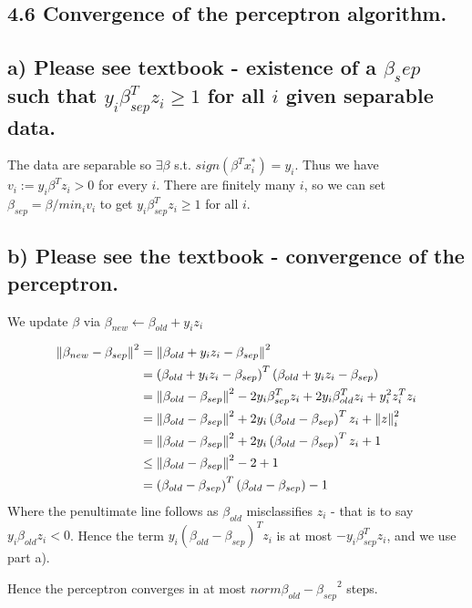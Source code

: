 \subsection*{ 4.6 Convergence of the perceptron algorithm.}
\subsection*{a) Please see textbook - existence of a $\beta_sep$ such that $y_i \beta_{sep}^T z_i \geq 1$ for all $i$ given separable data.}

The data are separable so $\exists \beta$ s.t. $ sign(\beta^T x_i^*) = y_i$.
Thus we have $v_i := y_i \beta^T z_i > 0$ for every $i$.
There are finitely many $i$, so we can set $\beta_{sep} = \beta / min_i v_i$ to get $y_i \beta_{sep}^T z_i \geq 1$ for all $i$.

\subsection*{b) Please see the textbook - convergence of the perceptron.}

We update $\beta$ via $\beta_{new} \leftarrow \beta_{old} + y_i z_i$

\begin{align*}
    \left\lVert\beta_{new} - \beta_{sep}\right\rVert^2 &= \left\lVert\beta_{old} + y_i z_i - \beta_{sep}\right\rVert^2\\
    &= \left(\beta_{old} + y_i z_i - \beta_{sep}\right)^T\left(\beta_{old} + y_i z_i - \beta_{sep}\right)\\
    &= \left\lVert\beta_{old}  - \beta_{sep}\right\rVert^2 - 2 y_i \beta_{sep}^T z_i + 2 y_i \beta_{old}^T z_i + y_i^2 z_i^T z_i \\
    &= \left\lVert\beta_{old}  - \beta_{sep}\right\rVert^2 + 2 y_i \left(\beta_{old} -\beta_{sep}\right)^T z_i + \left\lVert z\right\rVert_i^2\\
    &= \left\lVert\beta_{old}  - \beta_{sep}\right\rVert^2 + 2 y_i \left(\beta_{old} -\beta_{sep}\right)^T z_i + 1\\
    &\leq \left\lVert\beta_{old}  - \beta_{sep}\right\rVert^2 - 2 + 1\\
    &= \left(\beta_{old}  - \beta_{sep}\right)^T\left(\beta_{old}  - \beta_{sep}\right) - 1
\end{align*}
Where the penultimate line follows as $\beta_{old}$ misclassifies $z_i$ - that is to say
$y_i \beta_{old} z_i < 0$. Hence the term $y_i \left(\beta_{old} -\beta_{sep}\right)^Tz_i$ is at most $- y_i \beta_{sep}^T z_i$, and we use part a).

Hence the perceptron converges in at most $norm{\beta_{old}  - \beta_{sep}}^2 $ steps.


